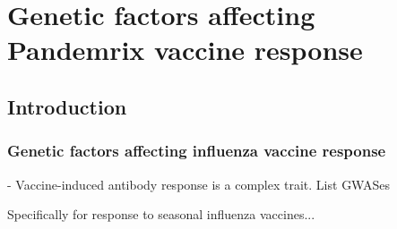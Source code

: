 %
%

\chapter{Genetic factors affecting Pandemrix vaccine response}
\label{chap:hird_reQTL}

\section{Introduction}

\subsection{Genetic factors affecting influenza vaccine response}

- Vaccine-induced antibody response is a complex trait. List GWASes

Specifically for response to seasonal influenza vaccines...




